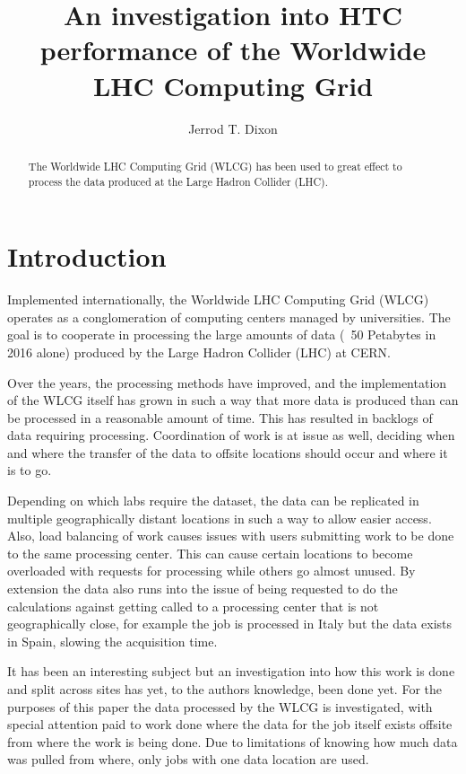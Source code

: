 \documentclass[sigconf]{acmart}
\title{An investigation into HTC performance of the Worldwide LHC Computing Grid}
\author{Jerrod T. Dixon}
\affiliation{%
	\institution{University of Nebraska - Lincoln}
	\streetaddress{P.O. Box 1212}
	\city{Lincoln} 
	\state{Nebraska} 
	\postcode{43017-6221}
}
\begin{document}
\maketitle

\begin{abstract}
The Worldwide LHC Computing Grid (WLCG) has been used to great effect to process the data produced at the Large Hadron Collider (LHC). 
\end{abstract}

\section{Introduction}
Implemented internationally, the Worldwide LHC Computing Grid (WLCG) operates as a conglomeration of computing centers managed by universities. The goal is to cooperate in processing the large amounts of data (~50 Petabytes in 2016 alone) produced by the Large Hadron Collider (LHC) at CERN.

Over the years, the processing methods have improved, and the implementation of the WLCG itself has grown in such a way that more data is produced than can be processed in a reasonable amount of time. This has resulted in backlogs of data requiring processing. Coordination of work is at issue as well, deciding when and where the transfer of the data to offsite locations should occur and where it is to go. 

Depending on which labs require the dataset, the data can be replicated in multiple geographically distant locations in such a way to allow easier access. Also, load balancing of work causes issues with users submitting work to be done to the same processing center. This can cause certain locations to become overloaded with requests for processing while others go almost unused. By extension the data also runs into the issue of being requested to do the calculations against getting called to a processing center that is not geographically close, for example the job is processed in Italy but the data exists in Spain, slowing the acquisition time. 

It has been an interesting subject but an investigation into how this work is done and split across sites has yet, to the authors knowledge, been done yet. For the purposes of this paper the data processed by the WLCG is investigated, with special attention paid to work done where the data for the job itself exists offsite from where the work is being done. Due to limitations of knowing how much data was pulled from where, only jobs with one data location are used.
\end{document}
